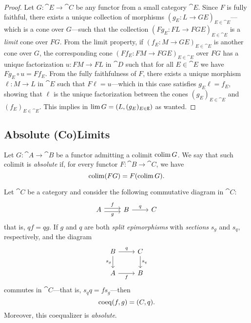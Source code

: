\begin{proof}
    Let \(G: \cat E \to \cat C\) be any functor from a small category \(\cat
    E\). Since \(F\) is fully faithful, there exists a unique collection of
    morphisms \((g_E: L \to G E)_{E \in \cat E}\)---which is a cone over
    \(G\)---such that the collection \((F g_E: F L \to F G E)_{E \in \cat E}\) is a
    \emph{limit} cone over \(F G\). From the limit property, if
    \((f_E: M \to G E)_{E \in \cat E} \) is another cone over \(G\), the
    corresponding cone \((F f_E: F M \to F G E)_{E \in \cat E}\) over \(F G\) has a
    unique factorization \(u: F M \to F L\) in \(\cat D\) such that for all
    \(E \in \cat E\) we have \(F g_E \circ u = F f_E\). From the fully faithfulness
    of \(F\), there exists a unique morphism \(\ell: M \to L\) in \(\cat E\) such
    that \(F \ell = u\)---which in this case satisfies \(g_E \ell = f_E\), showing
    that \(\ell\) is the unique factorization between the cones
    \((g_E)_{E \in \cat E}\) and \((f_E)_{E \in \cat E}\). This implies in
    \(\operatorname{lim} G = (L, (g_E)_{E \in \texttt E})\) as wanted.
\end{proof}

\subsection{Absolute (Co)Limits}

\begin{definition}
    \label{def:absolute-(co)-limit}
    Let \(G: \cat A \to \cat B\) be a functor admitting a colimit \(\operatorname{colim} G\). We
    say that such colimit is \emph{absolute} if, for every functor
    \(F: \cat B \to \cat C\), we have
    \[
        \operatorname{colim} (F G) = F (\operatorname{colim} G).
    \]
\end{definition}

\begin{proposition}
    \label{prop:absolute-coequalizer}
    Let \(\cat C\) be a category and consider the following commutative diagram in
    \(\cat C\):
    \[
        \begin{tikzcd}
            A \ar[r, shift left, "f"] \ar[r, shift right, "g"']
            &B \ar[r, "q"]
            &C
        \end{tikzcd}
    \]
    that is, \(q f = q g\). If \(g\) and \(q\) are both \emph{split epimorphisms}
    with \emph{sections} \(s_g\) and \(s_q\), respectively, and the diagram
    \[
        \begin{tikzcd}
            B \ar[r, "q"] \ar[d, "s_g"'] &C \ar[d, "s_q"] \\
            A \ar[r, "f"'] &B
        \end{tikzcd}
    \]
    commutes in \(\cat C\)---that is, \(s_q q = f s_g\)---then
    \[
        \operatorname{coeq}(f, g) = (C, q).
    \]
    Moreover, this coequalizer is \emph{absolute}.
\end{proposition}

